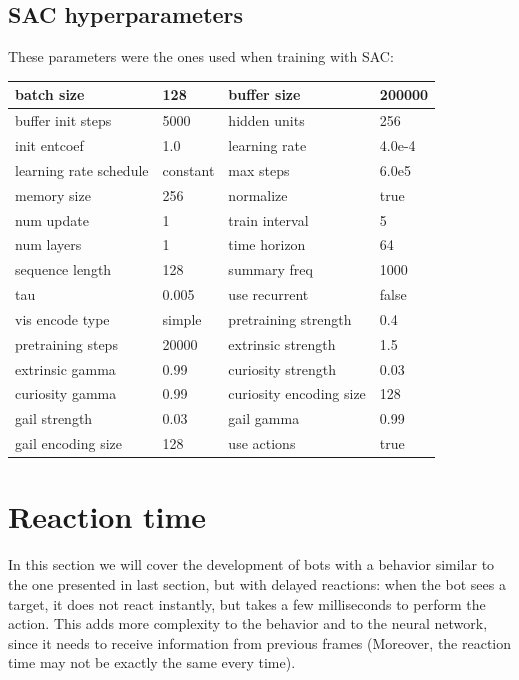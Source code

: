 \subsection{SAC hyperparameters}

These parameters were the ones used when training with SAC:
\begin{center}
	\begin{tabular}{ | m{4cm} | m{2.5cm}||m{4cm} | m{2.5cm} | } 
		\hline
			batch size & 128 & buffer size & 200000\\ 
		\hline
			buffer init steps & 5000 & hidden units & 256\\
		\hline
			init entcoef & 1.0 & learning rate & 4.0e-4\\
		\hline
			learning rate schedule & constant & max steps & 6.0e5\\
		\hline
			memory size & 256 & normalize & true\\
		\hline
			num update & 1 & train interval & 5\\
		\hline
			num layers & 1 & time horizon & 64\\
		\hline
			sequence length & 128 & summary freq & 1000\\
		\hline
			tau & 0.005 & use recurrent & false\\
		\hline
			vis encode type & simple & pretraining strength & 0.4\\
		\hline
			pretraining steps & 20000 & extrinsic strength & 1.5\\
		\hline
			extrinsic gamma & 0.99 & curiosity strength & 0.03\\
		\hline
			curiosity gamma & 0.99 & curiosity encoding size & 128\\
		\hline
			gail strength & 0.03 & gail gamma & 0.99\\
		\hline
			gail encoding size & 128 & use actions & true\\
		\hline
	\end{tabular}
\end{center}


\pagebreak

\section{Reaction time}

In this section we will cover the development of bots with a behavior similar to the one presented in last section, but with delayed reactions: when the bot sees a target, it does not react instantly, but takes a few milliseconds to perform the action. This adds more complexity to the behavior and to the neural network, since it needs to receive information from previous frames (Moreover, the reaction time may not be exactly the same every time).

